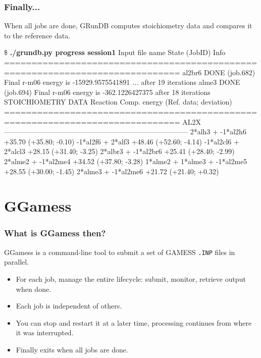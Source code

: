 \documentclass {beamer}
\begin{document}
\begin{frame}[fragile]
  \frametitle{Finally...}

  When all jobs are done, GRunDB computes stoichiometry data and
  compares it to the reference data.

  \begin{scriptsize}
\begin{semiverbatim}
\$ {\bf ./grundb.py progress session1}
Input file name  State (JobID)       Info
==============================================================================
al2br6           DONE (job.682)      Final r-m06 energy is -15929.9575541891
  {\em ...}                                                     after 19 iterations 
alme3            DONE (job.694)      Final r-m06 energy is -362.1226427375
                                                           after 18 iterations 
STOICHIOMETRY DATA
Reaction                            Comp. energy  (Ref. data; deviation)
==============================================================================
                                     AL2X
------------------------------------------------------------------------------
2*alh3 + -1*al2h6                         +35.70  (+35.80; -0.10)
-1*al2f6 + 2*alf3                         +48.46  (+52.60; -4.14)
-1*al2cl6 + 2*alcl3                       +28.15  (+31.40; -3.25)
2*albr3 + -1*al2br6                       +25.41  (+28.40; -2.99)
2*alme2 + -1*al2me4                       +34.52  (+37.80; -3.28)
1*alme2 + 1*alme3 + -1*al2me5             +28.55  (+30.00; -1.45)
2*alme3 + -1*al2me6                       +21.72  (+21.40; +0.32)
\end{semiverbatim}    
  \end{scriptsize}
\end{frame}

\section{GGamess}

\begin{frame}
  \frametitle{What is GGamess then?}
  
  GGamess is a command-line tool to submit a set of GAMESS
  \texttt{.INP} files in parallel.
  \begin{itemize}
  \item For each job, manage the entire lifecycle: submit, monitor,
    retrieve output when done.
  \item Each job is independent of others.
  \item You can stop and restart it at a later time, processing
    continues from where it was interrupted.
  \item Finally exits when all jobs are done.
  \end{itemize}
\end{frame}
\end{document}
